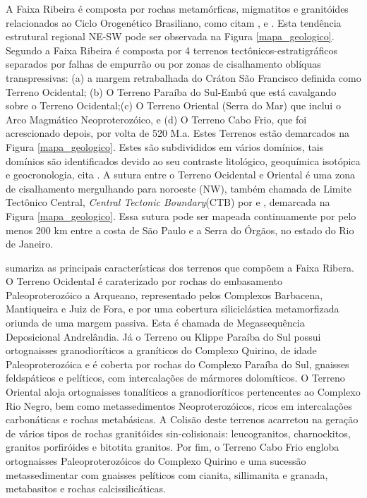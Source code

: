 A Faixa Ribeira é composta por rochas metamórficas, migmatitos e granitóides relacionados ao Ciclo Orogenético Brasiliano, como citam \cite{kuhn_metamorphic_2004}, \cite{heilbron_evolution_2010} e \cite{valeriano_u_pb_2011}. Esta tendência estrutural regional NE-SW pode ser observada na Figura \ref{mapa_geologico}. Segundo \cite{heilbron_evolution_2010} a Faixa Ribeira é composta por 4 terrenos tectônicos-estratigráficos separados por falhas de
empurrão ou por zonas de cisalhamento oblíquas transpressivas: (a) a margem retrabalhada do Cráton São Francisco definida como Terreno Ocidental; (b) O Terreno Paraíba do Sul-Embú que está cavalgando sobre o Terreno Ocidental;(c) O Terreno Oriental (Serra do Mar) que inclui o Arco Magmático Neoproterozóico, e (d) O Terreno Cabo Frio, que foi acrescionado depois, por volta de 520 M.a. Estes Terrenos estão demarcados na Figura \ref{mapa_geologico}. Estes são subdivididos em vários domínios, tais domínios são identificados devido ao seu contraste litológico, geoquímica isotópica e geocronologia, cita \cite{kuhn_metamorphic_2004}. A sutura entre o Terreno Ocidental e Oriental é uma zona de cisalhamento mergulhando para noroeste (NW), também chamada de Limite Tectônico Central, \textit{Central Tectonic Boundary}(CTB) por \cite{heilbron_evolution_2010} e \cite{trouw_new_2013}, demarcada na Figura \ref{mapa_geologico}. Essa sutura pode ser mapeada continuamente por pelo menos 200 km entre a costa de São Paulo e a Serra do Órgãos, no estado do Rio de Janeiro. 

\cite{trouw_new_2013} sumariza as principais características dos terrenos que compõem a Faixa Ribera. O Terreno Ocidental é caraterizado por rochas do embasamento Paleoproterozóico a Arqueano, representado pelos Complexos Barbacena, Mantiqueira e Juiz de Fora, e por uma cobertura siliciclástica metamorfizada oriunda de uma margem passiva. Esta é chamada de Megassequência Deposicional Andrelândia. Já o Terreno ou Klippe Paraíba do Sul possui ortognaisses granodioríticos a graníticos do Complexo Quirino, de idade Paleoproterozóica e é coberta por rochas do Complexo Paraíba do Sul, gnaisses feldspáticos e pelíticos, com intercalações de mármores dolomíticos. O Terreno Oriental aloja ortognaisses tonalíticos a granodioríticos pertencentes ao Complexo Rio Negro, bem como metassedimentos Neoproterozóicos, ricos em intercalações carbonáticas e rochas metabásicas. A Colisão deste terrenos acarretou na geração de vários tipos de rochas granitóides sin-colisionais: leucogranitos, charnockitos, granitos porfiróides e bitotita granitos. Por fim, o Terreno Cabo Frio engloba ortognaisses Paleoproterozóicos do Complexo Quirino e uma sucessão metassedimentar com gnaisses pelíticos com cianita, sillimanita e granada, metabasitos e rochas calcissilicáticas. 

